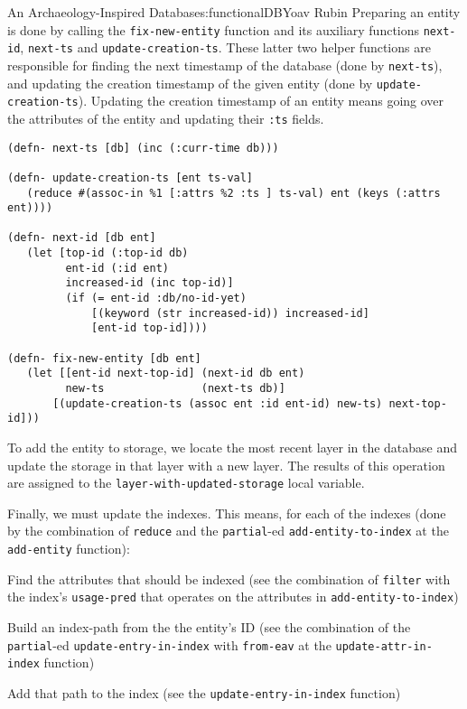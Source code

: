 \begin{aosachapter}{An Archaeology-Inspired Database}{s:functionalDB}{Yoav Rubin}
Preparing an entity is done by calling the \texttt{fix-new-entity}
function and its auxiliary functions \texttt{next-id}, \texttt{next-ts}
and \texttt{update-creation-ts}. These latter two helper functions are
responsible for finding the next timestamp of the database (done by
\texttt{next-ts}), and updating the creation timestamp of the given
entity (done by \texttt{update-creation-ts}). Updating the creation
timestamp of an entity means going over the attributes of the entity and
updating their \texttt{:ts} fields.

\begin{verbatim}
(defn- next-ts [db] (inc (:curr-time db)))

(defn- update-creation-ts [ent ts-val]
   (reduce #(assoc-in %1 [:attrs %2 :ts ] ts-val) ent (keys (:attrs ent))))

(defn- next-id [db ent]
   (let [top-id (:top-id db)
         ent-id (:id ent)
         increased-id (inc top-id)]
         (if (= ent-id :db/no-id-yet)
             [(keyword (str increased-id)) increased-id]
             [ent-id top-id])))

(defn- fix-new-entity [db ent]
   (let [[ent-id next-top-id] (next-id db ent)
         new-ts               (next-ts db)]
       [(update-creation-ts (assoc ent :id ent-id) new-ts) next-top-id]))
\end{verbatim}

To add the entity to storage, we locate the most recent layer in the
database and update the storage in that layer with a new layer. The
results of this operation are assigned to the
\texttt{layer-with-updated-storage} local variable.

Finally, we must update the indexes. This means, for each of the indexes
(done by the combination of \texttt{reduce} and the \texttt{partial}-ed
\texttt{add-entity-to-index} at the \texttt{add-entity} function):

\begin{aosaitemize}

\item
  Find the attributes that should be indexed (see the combination of
  \texttt{filter} with the index's \texttt{usage-pred} that operates on
  the attributes in \texttt{add-entity-to-index})
\item
  Build an index-path from the the entity's ID (see the combination of
  the \texttt{partial}-ed \texttt{update-entry-in-index} with
  \texttt{from-eav} at the \texttt{update-attr-in-index} function)
\item
  Add that path to the index (see the \texttt{update-entry-in-index}
  function)
\end{aosaitemize}


\end{aosachapter}
